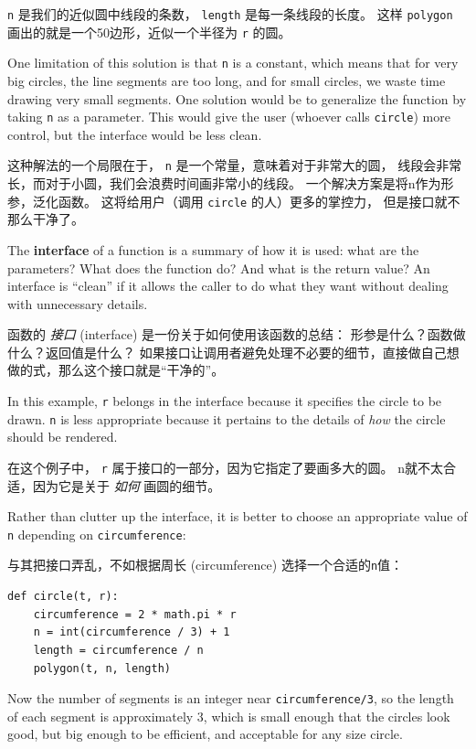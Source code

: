 \lstinline{n} 是我们的近似圆中线段的条数， \lstinline{length} 是每一条线段的长度。
这样 \lstinline{polygon} 画出的就是一个50边形，近似一个半径为 \lstinline{r} 的圆。

One limitation of this solution is that {\tt n} is a constant, which
means that for very big circles, the line segments are too long, and
for small circles, we waste time drawing very small segments.  One
solution would be to generalize the function by taking {\tt n} as
a parameter.  This would give the user (whoever calls {\tt circle})
more control, but the interface would be less clean.

这种解法的一个局限在于， \lstinline{n} 是一个常量，意味着对于非常大的圆，
线段会非常长，而对于小圆，我们会浪费时间画非常小的线段。
一个解决方案是将n作为形参，泛化函数。
这将给用户（调用 \lstinline{circle} 的人）更多的掌控力， 但是接口就不那么干净了。

The {\bf interface} of a function is a summary of how it is used: what
are the parameters?  What does the function do?  And what is the return
value?  An interface is ``clean'' if it allows the caller to do
what they want without dealing with unnecessary details.

函数的 \emph{接口} (interface) 是一份关于如何使用该函数的总结：
形参是什么？函数做什么？返回值是什么？
如果接口让调用者避免处理不必要的细节，直接做自己想做的式，那么这个接口就是``干净的''。

In this example, {\tt r} belongs in the interface because it
specifies the circle to be drawn.  {\tt n} is less appropriate
because it pertains to the details of {\em how} the circle should
be rendered.

在这个例子中， \lstinline{r} 属于接口的一部分，因为它指定了要画多大的圆。
n就不太合适，因为它是关于 \emph{如何} 画圆的细节。

Rather than clutter up the interface, it is better
to choose an appropriate value of {\tt n}
depending on {\tt circumference}:

与其把接口弄乱，不如根据周长 (circumference) 选择一个合适的\lstinline{n}值：

\begin{lstlisting}
def circle(t, r):
    circumference = 2 * math.pi * r
    n = int(circumference / 3) + 1
    length = circumference / n
    polygon(t, n, length)
\end{lstlisting}

%
Now the number of segments is an integer near {\tt circumference/3},
so the length of each segment is approximately 3, which is small
enough that the circles look good, but big enough to be efficient,
and acceptable for any size circle.

